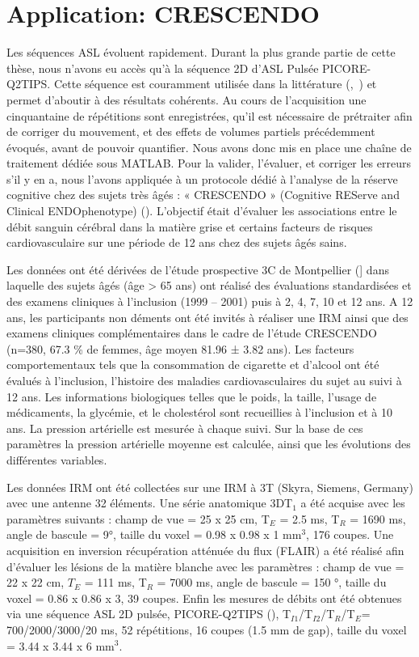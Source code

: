 \section{Application: CRESCENDO}
Les séquences ASL évoluent rapidement. Durant la plus grande partie de cette thèse, nous
n’avons eu accès qu’à la séquence 2D d’ASL Pulsée PICORE-Q2TIPS. Cette séquence est couramment
utilisée dans la littérature (\cite{Bastos-Leite2008},~\cite{Haller2013}) et permet d’aboutir à des résultats cohérents. Au cours de
l’acquisition une cinquantaine de répétitions sont enregistrées, qu’il est nécessaire de prétraiter afin
de corriger du mouvement, et des effets de volumes partiels précédemment évoqués, avant de
pouvoir quantifier. Nous avons donc mis en place une chaîne de traitement dédiée sous MATLAB. Pour
la valider, l’évaluer, et corriger les erreurs s’il y en a, nous l’avons appliquée à un protocole dédié à
l’analyse de la réserve cognitive chez des sujets très âgés : « CRESCENDO » (Cognitive REServe and
Clinical ENDOphenotype) (\cite{Deverdun2015}). L’objectif était d’évaluer les associations entre le débit sanguin
cérébral dans la matière grise et certains facteurs de risques cardiovasculaire sur une période de 12
ans chez des sujets âgés sains.

Les données ont été dérivées de l’étude prospective 3C de Montpellier (\cite{Alperovitch2002}] dans laquelle des
sujets âgés (âge > 65 ans) ont réalisé des évaluations standardisées et des examens cliniques à
l’inclusion (1999 – 2001) puis à 2, 4, 7, 10 et 12 ans. A 12 ans, les participants non déments ont été
invités à réaliser une IRM ainsi que des examens cliniques complémentaires dans le cadre de l’étude
CRESCENDO (n=380, 67.3 \% de femmes, âge moyen 81.96 ± 3.82 ans). Les facteurs comportementaux
tels que la consommation de cigarette et d’alcool ont été évalués à l’inclusion, l’histoire des maladies
cardiovasculaires du sujet au suivi à 12 ans. Les informations biologiques telles que le poids, la taille,
l’usage de médicaments, la glycémie, et le cholestérol sont recueillies à l’inclusion et à 10 ans. La
pression artérielle est mesurée à chaque suivi. Sur la base de ces paramètres la pression artérielle
moyenne est calculée, ainsi que les évolutions des différentes variables.

Les données IRM ont été collectées sur une IRM à 3T (Skyra, Siemens, Germany) avec une
antenne 32 éléments. Une série anatomique 3DT$_1$ a été acquise avec les paramètres suivants : champ
de vue = 25 x 25 cm, T$_E$ = 2.5 ms, T$_R$ = 1690 ms, angle de bascule = 9°, taille du voxel = 0.98 x 0.98 x 1
mm$^3$, 176 coupes. Une acquisition en inversion récupération atténuée du flux (FLAIR) a été réalisé afin
d’évaluer les lésions de la matière blanche avec les paramètres : champ de vue = 22 x 22 cm, $T_E$ = 111
ms, T$_R$ = 7000 ms, angle de bascule = 150 °, taille du voxel = 0.86 x 0.86 x 3, 39 coupes. Enfin les mesures
de débits ont été obtenues via une séquence ASL 2D pulsée, PICORE-Q2TIPS (\cite{Luh1999}), T$_{I1}$/T$_{I2}$/T$_{R}$/T$_{E}$=
700/2000/3000/20 ms, 52 répétitions, 16 coupes (1.5 mm de gap), taille du voxel = 3.44 x 3.44 x 6 mm$^3$.

